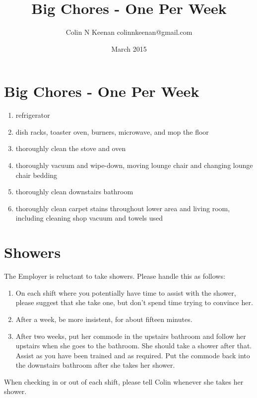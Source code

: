 \documentclass[12pt,letterpaper]{article}
\newcommand{\mytitle}{Big Chores - One Per Week}
\begin{document}
\title{\mytitle{}}
\author{Colin N Keenan colinnkeenan@gmail.com}
\date{March 2015}
\section*{\mytitle{}}
\begin{enumerate}
	\item refrigerator
	\item dish racks, toaster oven, burners, microwave, and mop the floor
	\item thoroughly clean the stove and oven
	\item thoroughly vacuum and wipe-down, moving lounge chair and changing lounge chair bedding
	\item thoroughly clean downstairs bathroom
	\item thoroughly clean carpet stains throughout lower area and living room, including cleaning shop vacuum and towels used
\end{enumerate}
\section*{Showers}
The Employer is reluctant to take showers. Please handle this as follows:
\begin{enumerate}
	\item On each shift where you potentially have time to assist with the shower, please suggest that she take one, but don't spend time trying to convince her.
	\item After a week, be more insistent, for about fifteen minutes.
	\item After two weeks, put her commode in the upstairs bathroom and follow her upstairs when she goes to the bathroom. She should take a shower after that. Assist as you have been trained and as required. Put the commode back into the downstairs bathroom after she takes her shower.
\end{enumerate}
When checking in or out of each shift, please tell Colin whenever she takes her shower.
\end{document}
